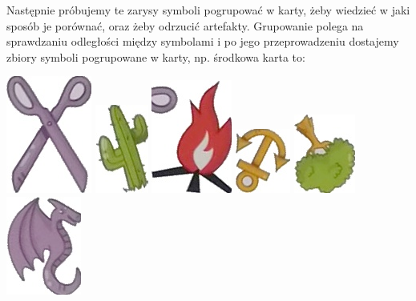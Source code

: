 \documentclass[10pt,a4paper]{article}
\begin{document}
Następnie próbujemy te zarysy symboli pogrupować w karty, żeby wiedzieć w jaki sposób je porównać, oraz żeby odrzucić artefakty. Grupowanie polega na sprawdzaniu odległości między symbolami i po jego przeprowadzeniu dostajemy zbiory symboli pogrupowane w karty, np. środkowa karta to:
\begin{center}
\includegraphics[scale=0.5]{2.3/card1sign0.jpg}
\includegraphics[scale=0.5]{2.3/card1sign1.jpg}
\includegraphics[scale=0.5]{2.3/card1sign2.jpg}
\includegraphics[scale=0.5]{2.3/card1sign3.jpg}
\includegraphics[scale=0.5]{2.3/card1sign4.jpg}
\includegraphics[scale=0.5]{2.3/card1sign5.jpg}

\end{center}
\end{document}
